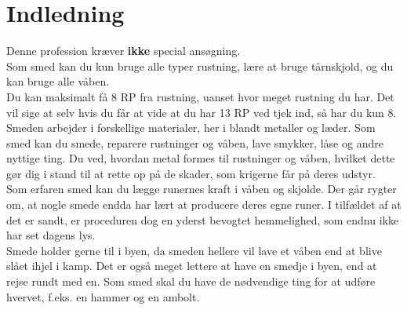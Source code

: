 \chapter{Indledning}

Denne profession kræver \textbf{ikke} special ansøgning.\\
Som smed kan du kun bruge alle typer rustning, lære at bruge tårnskjold, og du kan bruge alle våben.\\
Du kan maksimalt få 8 RP fra rustning, uanset hvor meget rustning du har. Det vil sige at selv hvis du får at vide at du har 13 RP ved tjek ind, så har du kun 8.\\

Smeden arbejder i forskellige materialer, her i blandt metaller og læder. Som smed kan du smede, reparere rustninger og våben, lave smykker, låse og andre nyttige ting. Du ved, hvordan metal formes til rustninger og våben, hvilket dette gør dig i stand til at rette op på de skader, som krigerne får på deres udstyr.\\
Som erfaren smed kan du lægge runernes kraft i våben og skjolde. Der går rygter om, at nogle smede endda har lært at producere deres egne runer. I tilfældet af at det er sandt, er proceduren dog en yderst bevogtet hemmelighed, som endnu ikke har set dagens lys.\\
Smede holder gerne til i byen, da smeden hellere vil lave et våben end at blive slået ihjel i kamp. Det er også meget lettere at have en smedje i byen, end at rejse rundt med en. Som smed skal du have de nødvendige ting for at udføre hvervet, f.eks. en hammer og en ambolt.